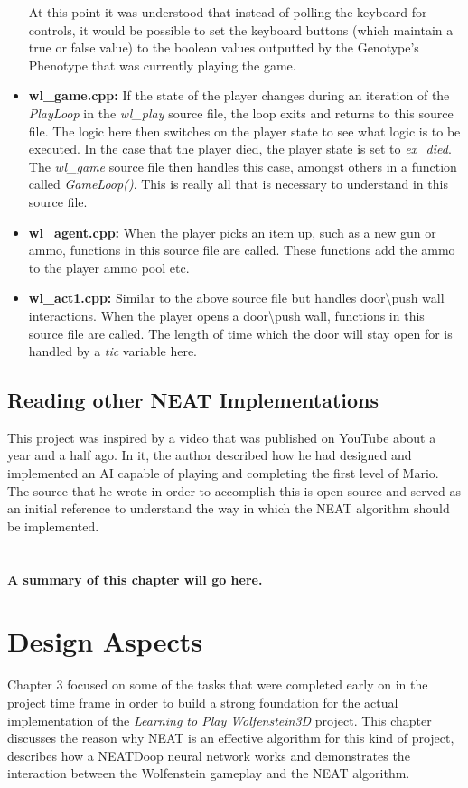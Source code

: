 \documentclass[]{Learning-to-Play-Wolfenstein-thesis}
\begin{document}
\begin{itemize}
At this point it was understood that instead of polling the keyboard for controls, it would be possible to set the keyboard buttons (which maintain a true or false value) to the boolean values outputted by the Genotype's Phenotype that was currently playing the game.
\item\textbf{wl\_game.cpp:} If the state of the player changes during an iteration of the \textit{PlayLoop} in the \textit{wl\_play} source file, the loop exits and returns to this source file. The logic here then switches on the player state to see what logic is to be executed. In the case that the player died, the player state is set to \textit{ex\_died}. The \textit{wl\_game} source file then handles this case, amongst others in a function called \textit{GameLoop()}. This is really all that is necessary to understand in this source file. 
\item\textbf{wl\_agent.cpp:} When the player picks an item up, such as a new gun or ammo, functions in this source file are called. These functions add the ammo to the player ammo pool etc. 
\item\textbf{wl\_act1.cpp:} Similar to the above source file but handles door\textbackslash push wall interactions. When the player opens a door\textbackslash push wall, functions in this source file are called. The length of time which the door will stay open for is handled by a \textit{tic} variable here.
\end{itemize}
\section{Reading other NEAT Implementations}
This project was inspired by a video that was published on YouTube about a year and a half ago. In it, the author described how he had designed and implemented an AI capable of playing and completing the first level of Mario. The source that he wrote in order to accomplish this is open-source and served as an initial reference to understand the way in which the NEAT algorithm should be implemented. \\\\\\\textbf{A summary of this chapter will go here.}


\chapter{Design Aspects}%
Chapter 3 focused on some of the tasks that were completed early on in the project time frame in order to build a strong foundation for the actual implementation of the \textit{Learning to Play Wolfenstein3D} project. This chapter discusses the reason why NEAT is an effective algorithm for this kind of project, describes how a NEATDoop neural network works and demonstrates the interaction between the Wolfenstein gameplay and the NEAT algorithm.
\end{document}
